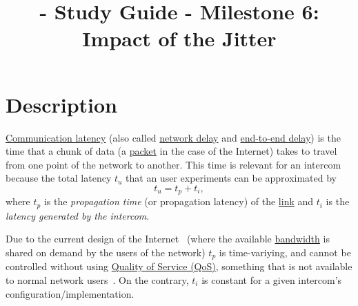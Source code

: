 
\title{\TM{} - Study Guide - Milestone 6: Impact of the Jitter}

\maketitle

\section{Description}

\href{https://en.wikipedia.org/wiki/Latency_(engineering)#Communication_latency}{Communication
  latency} (also called
\href{https://en.wikipedia.org/wiki/Network_delay}{network delay} and
\href{https://en.wikipedia.org/wiki/End-to-end_delay}{end-to-end
  delay}) is the time that a chunk of data (a
\href{https://en.wikipedia.org/wiki/Network_packet}{packet} in the
case of the Internet) takes to travel from one point of the network to
another. This time is relevant for an intercom because the total
latency $t_u$ that an user experiments can be approximated by
\begin{equation}
  t_u = t_p + t_i,
  \label{eq:user_latency}
\end{equation}
where $t_p$ is the \emph{propagation time} (or propagation latency) of
the \href{https://en.wikipedia.org/wiki/Telecommunications_link}{link}
and $t_i$ is the \emph{latency generated by the intercom}.

Due to the current design of the Internet~\cite{Tanenbaum,Stallings} (where the
available
\href{https://en.wikipedia.org/wiki/Bandwidth_(computing)}{bandwidth}
is shared on demand by the users of the network) $t_p$ is
time-variying, and cannot be controlled without using
\href{https://en.wikipedia.org/wiki/Quality_of_service}{Quality of
  Service (QoS)}, something that is not available to normal network
users~\cite{dordal2020intro}. On the contrary, $t_i$ is constant for a
given intercom's configuration/implementation.


